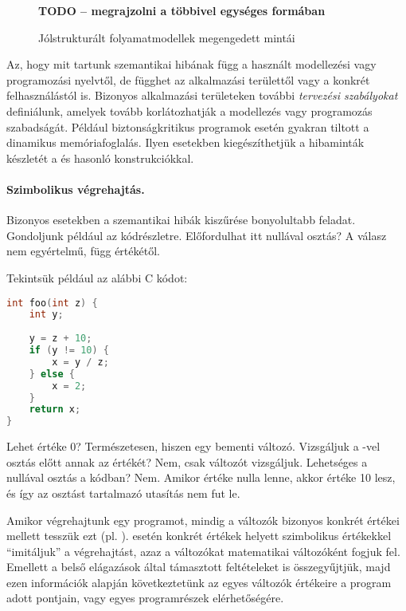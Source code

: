 \begin{figure}[h]
	\centering
	\textbf{TODO -- megrajzolni a többivel egységes formában}
	
	\caption{Jólstrukturált folyamatmodellek megengedett mintái}
	\label{fig:jolstrukturalt-folyamatmodellek-mintai}
\end{figure}

Az, hogy mit tartunk szemantikai hibának függ a használt modellezési vagy programozási nyelvtől, de függhet az alkalmazási területtől vagy a konkrét felhasználástól is. Bizonyos alkalmazási területeken további \emph{tervezési szabályokat} definiálunk, amelyek tovább korlátozhatják a modellezés vagy programozás szabadságát. Például biztonságkritikus programok esetén gyakran tiltott a dinamikus memóriafoglalás. Ilyen esetekben kiegészíthetjük a hibaminták készletét a  és hasonló konstrukciókkal.

\paragraph{Szimbolikus végrehajtás.}
Bizonyos esetekben a szemantikai hibák kiszűrése bonyolultabb feladat. Gondoljunk például az  kódrészletre. Előfordulhat itt nullával osztás? A válasz nem egyértelmű, függ  értékétől.

\begin{megjegyzes}
Tekintsük például az alábbi C kódot:
\begin{lstlisting}[language=C]
int foo(int z) {
    int y;
	
    y = z + 10;
    if (y != 10) {
        x = y / z;
    } else {
        x = 2;
    }
    return x;
}
\end{lstlisting}

Lehet  értéke 0? Természetesen, hiszen  egy bementi változó. Vizsgáljuk a -vel osztás előtt annak az értékét? Nem, csak  változót vizsgáljuk. Lehetséges a nullával osztás a kódban? Nem. Amikor  értéke nulla lenne, akkor  értéke 10 lesz, és így az osztást tartalmazó utasítás nem fut le.
\end{megjegyzes}

Amikor végrehajtunk egy programot, mindig a változók bizonyos konkrét értékei mellett tesszük ezt (pl. ).  esetén konkrét értékek helyett szimbolikus értékekkel ``imitáljuk'' a végrehajtást, azaz a változókat matematikai változóként fogjuk fel. Emellett a belső elágazások által támasztott feltételeket is összegyűjtjük, majd ezen információk alapján következtetünk az egyes változók értékeire a program adott pontjain, vagy egyes programrészek elérhetőségére.

